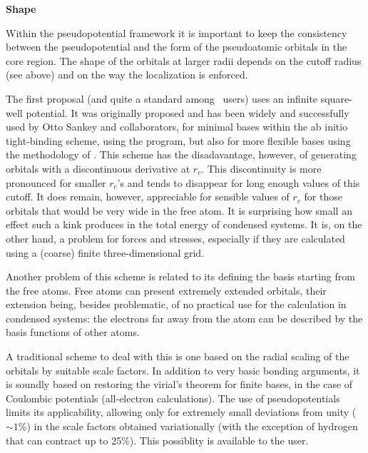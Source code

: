 \textbf{Shape}

Within the pseudopotential framework it is important to keep the
consistency between the pseudopotential and the form of the
pseudoatomic orbitals in the core region.  The shape of the orbitals
at larger radii depends on the cutoff radius (see above) and on the
way the localization is enforced.

The first proposal (and quite a standard among \siesta\ users)
uses an infinite square-well potential.  It was originally proposed
and has been widely and successfully used by Otto Sankey and
collaborators, for minimal bases within the ab initio tight-binding
scheme, using the  program, but also for more flexible
bases using the methodology of \siesta.  This scheme has the
disadavantage, however, of generating orbitals with a discontinuous
derivative at $r_c$.  This discontinuity is more pronounced for
smaller $r_c$'s and tends to disappear for long enough values of this
cutoff.  It does remain, however, appreciable for sensible values of
$r_c$ for those orbitals that would be very wide in the free atom.  It
is surprising how small an effect such a kink produces in the total
energy of condensed systems.  It is, on the other hand, a problem for
forces and stresses, especially if they are calculated using a
(coarse) finite three-dimensional grid.

Another problem of this scheme is related to its defining the basis
starting from the free atoms.  Free atoms can present extremely extended
orbitals, their extension being, besides problematic, of no practical
use for the calculation in condensed systems: the electrons far away
from the atom can be described by the basis functions of other atoms.

A traditional scheme to deal with this is one based on the radial
scaling of the orbitals by suitable scale factors.  In addition to
very basic bonding arguments, it is soundly based on restoring
the virial's theorem for finite bases, in the case of Coulombic potentials
(all-electron calculations).  The use of pseudopotentials limits its
applicability, allowing only for extremely small deviations from unity
($\sim 1\%$) in the scale factors obtained variationally (with the
exception of hydrogen that can contract up to 25\%). This possiblity
is available to the user.

